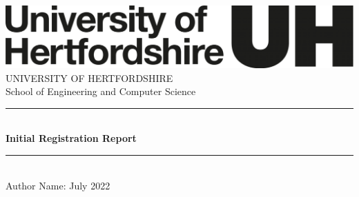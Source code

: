 \newcommand{\reporttitle}{Initial Registration Report}
\newcommand{\reportauthor}{Author Name}
\newcommand{\reportdate}{1 July 2022}

\begin{titlepage}

\newcommand{\HRule}{\rule{\linewidth}{0.5mm}}
\center
\vspace{2cm}
\includegraphics[scale=0.2]{herts-logo-black.png} \\[4cm]
\textsf{\LARGE
UNIVERSITY OF HERTFORDSHIRE
} \\[1cm]
\textsf{\LARGE
School of Engineering and Computer Science} \\[4cm]


\HRule \\[0.4cm]
{ \huge \bfseries \reporttitle \\[0.15cm] }
\HRule \\[1.5cm]
\textsf{\large \reportauthor \enspace : \enspace \reportdate}


\end{titlepage}
